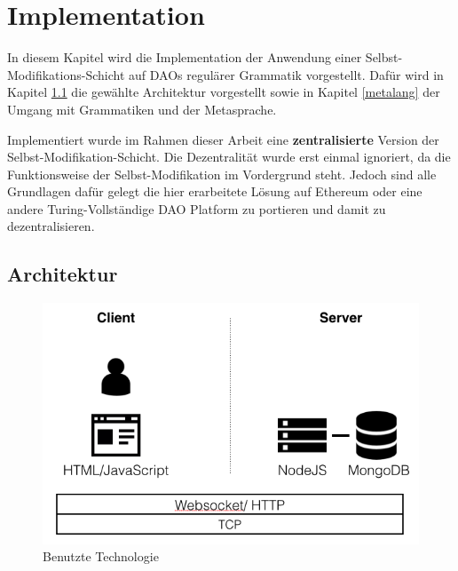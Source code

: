\documentclass[a4paper,12pt]{report}
\begin{document}
\chapter{Implementation}
\label{implementation}

In diesem Kapitel wird die Implementation der Anwendung einer Selbst-Modifikations-Schicht auf DAOs regulärer Grammatik vorgestellt. Dafür wird in Kapitel \ref{architecture} die gewählte Architektur vorgestellt sowie in Kapitel \ref{metalang} der Umgang mit Grammatiken und der Metasprache.

Implementiert wurde im Rahmen dieser Arbeit eine \textbf{zentralisierte} Version der Selbst-Modifikation-Schicht. Die Dezentralität wurde erst einmal ignoriert, da die Funktionsweise der Selbst-Modifikation im Vordergrund steht. Jedoch sind alle Grundlagen dafür gelegt die hier erarbeitete Lösung auf Ethereum oder eine andere Turing-Vollständige DAO Platform zu portieren und damit zu dezentralisieren.


\section{Architektur}
\label{architecture}

\begin{figure}[ht]
    \centering
    \includegraphics[width=1\textwidth]{bilder/client-server.png}
    \caption{Benutzte Technologie}
    \label{client-server}
\end{figure}
\end{document}
